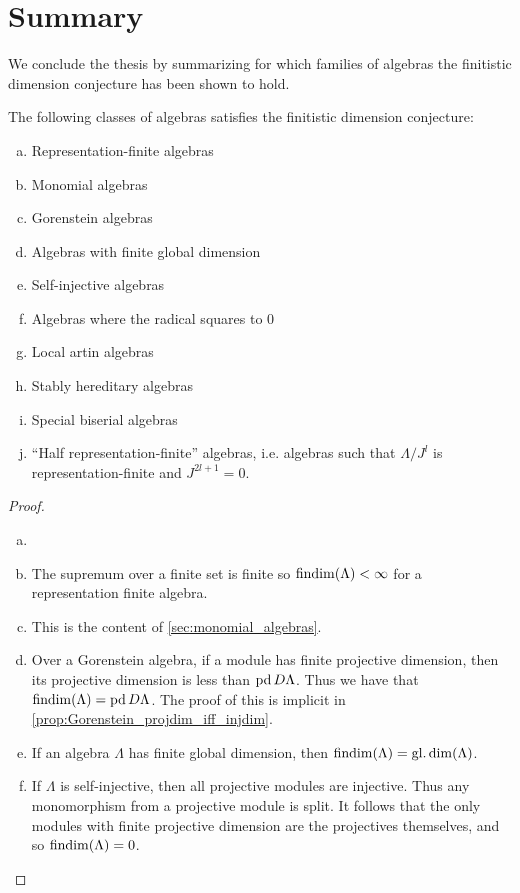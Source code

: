 \section{Summary}\label{sec:summary}

We conclude the thesis by summarizing for which families of algebras the finitistic dimension conjecture has been shown to hold.

\begin{theorem}\label{thm:findim_summary}
	The following classes of algebras satisfies the finitistic dimension conjecture:
	\begin{enumerate}[a)]
		\item Representation-finite algebras
		\item Monomial algebras
		\item Gorenstein algebras
		\item Algebras with finite global dimension
		\item Self-injective algebras
		\item Algebras where the radical squares to 0
		\item Local artin algebras
		\item Stably hereditary algebras
		\item Special biserial algebras
		\item ``Half representation-finite'' algebras, i.e. algebras such that $\Lambda/J^l$ is representation-finite and $J^{2l+1}=0$.
	\end{enumerate}
	\begin{proof}
		\begin{enumerate}[(a)]
			\item[]
			\item The supremum over a finite set is finite so $\operatorname{findim}(\Lambda) < \infty$ for a representation finite algebra.
			\item This is the content of \cref{sec:monomial_algebras}.
			\item Over a Gorenstein algebra, if a module has finite projective dimension, then its projective dimension is less than $\operatorname{pd} D\Lambda$. Thus we have that $\operatorname{findim}(\Lambda)=\operatorname{pd} D\Lambda$. The proof of this is implicit in \cref{prop:Gorenstein_projdim_iff_injdim}.
			\item If an algebra $\Lambda$ has finite global dimension, then $\operatorname{findim}(\Lambda) = \operatorname{gl.dim}(\Lambda)$.
			\item If $\Lambda$ is self-injective, then all projective modules are injective. Thus any monomorphism from a projective module is split. It follows that the only modules with finite projective dimension are the projectives themselves, and so $\operatorname{findim}(\Lambda)=0$.

\end{enumerate}
\end{proof}
\end{theorem}
